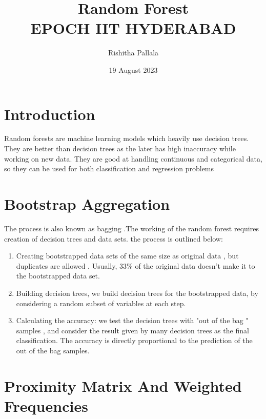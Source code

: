 \documentclass{article}
\title{\textbf{Random Forest}\\EPOCH IIT HYDERABAD}
\author{Rishitha Pallala }
\date{19 August 2023}
\begin{document}
\maketitle
\section{Introduction}
 Random forests are machine learning models which heavily use decision trees. They are better than decision trees as the later has high inaccuracy while working on new data. They are good at handling continuous and categorical data, so they can be used for both classification and regression problems
 \section{Bootstrap Aggregation}
 The process is also known as bagging .The working of the random forest requires creation of decision trees and data sets. the process is outlined below:
  \begin{enumerate}
      \item Creating bootstrapped data sets of the same size as original data , but duplicates are allowed . Usually, 33$\%$ of the original data doesn't make it to the bootstrapped data set.
      \item Building decision trees, we build decision trees for the bootstrapped data, by considering a random subset of variables at each step. 
      \item Calculating the accuracy: we test the decision trees with "out of the bag " samples , and consider the result given by many decision trees as the final classification. The accuracy is directly proportional to the prediction of the out of the bag samples.
  \end{enumerate}
  \section{Proximity Matrix And Weighted Frequencies}
  
\end{document}

